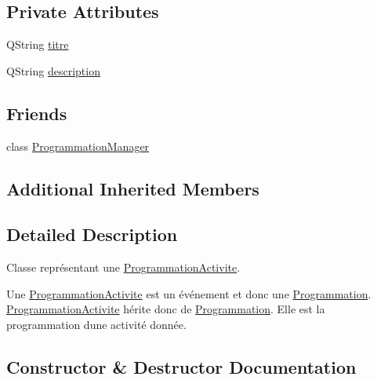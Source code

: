 \subsection*{Private Attributes}
\begin{DoxyCompactItemize}
\item 
Q\+String \hyperlink{class_programmation_activite_aa6f6ff264184635b35615abb4e45ab62}{titre}
\item 
Q\+String \hyperlink{class_programmation_activite_ae2a01c5cfffda9813ae77c1b98c7a52b}{description}
\end{DoxyCompactItemize}
\subsection*{Friends}
\begin{DoxyCompactItemize}
\item 
class \hyperlink{class_programmation_activite_ade7bfcbf8cec66b12064c8ff25993d73}{Programmation\+Manager}
\end{DoxyCompactItemize}
\subsection*{Additional Inherited Members}


\subsection{Detailed Description}
Classe représentant une \hyperlink{class_programmation_activite}{Programmation\+Activite}. 

Une \hyperlink{class_programmation_activite}{Programmation\+Activite} est un événement et donc une \hyperlink{class_programmation}{Programmation}. \hyperlink{class_programmation_activite}{Programmation\+Activite} hérite donc de \hyperlink{class_programmation}{Programmation}. Elle est la programmation d\textquotesingle{}une activité donnée. 

\subsection{Constructor \& Destructor Documentation}
\hypertarget{class_programmation_activite_a2492901bfd220779a942fabade7486d1}{}
